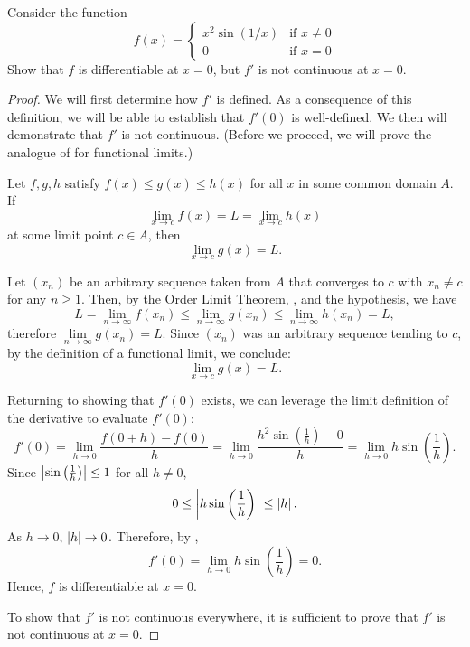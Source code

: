 \begin{problem}
  Consider the function
    \begin{equation*}
      f(x) = 
      \begin{cases}
        x^2 \sin(1/x) & \text{if } x \neq 0 \\
        0 & \text{if } x = 0
      \end{cases}
    \end{equation*}
  Show that $f$ is differentiable at $x = 0$, but $f'$ is not continuous at $x = 0$.

  \begin{proof}
    We will first determine how $f'$ is defined. As a consequence of this definition, we will be able to establish
    that $f'(0)$ is well-defined. We then will demonstrate that $f'$ is not continuous.
    (Before we proceed, we will prove the analogue of  for 
    functional limits.)

    \begin{theorem}
      \label{thm:squeeze-theorem-fn-limits}
      Let $f, g, h$ satisfy $f(x) \leq g(x) \leq h(x)$ for all $x$ in some common domain $A$. If
      \[
        \lim_{x \to c} f(x) = L = \lim_{x \to c} h(x)
      \]
      at some limit point $c \in A$, then
      \[
        \lim_{x \to c} g(x) = L.
      \]
    \end{theorem}

    \begin{subproof}
      Let $(x_{n})$ be an arbitrary sequence taken from $A$ that converges to
      $c$ with $x_{n} \neq c$ for any $n \geq 1$. Then, by the Order Limit
      Theorem, , and the hypothesis, we
      have
      \[
        L = \lim_{n \to \infty} f(x_{n}) \leq \lim_{n \to \infty} g(x_{n}) \leq \lim_{n \to \infty} h(x_{n}) = L,
      \]
      therefore $\lim\limits_{n \to \infty} g(x_{n}) = L$. Since $(x_{n})$ was
      an arbitrary sequence tending to $c$, by the definition of a functional limit,
      we conclude:
      \[
        \lim_{x \to c} g(x) = L.
      \]
    \end{subproof}

    Returning to showing that $f'(0)$ exists, we can leverage the limit
    definition of the derivative to evaluate $f'(0)$:
    \[
      f'(0) = \lim_{h \to 0} \frac{f(0+h) - f(0)}{h} = \lim_{h \to 0} \frac{h^2 \sin \left( \frac{1}{h} \right) - 0}{h} = \lim_{h \to 0} h \sin \left( \frac{1}{h} \right).
    \]
    Since $\left\lvert \sin \left( \frac{1}{h} \right) \right\rvert \leq 1$ for all $h \neq 0$,
    \[
      0 \leq \left\lvert h \sin \left( \frac{1}{h} \right) \right\rvert \leq \left\lvert h \right\rvert.
    \]
    As $h \to 0$, $\left\lvert h \right\rvert \to 0$. Therefore, by ,
    \[
      f'(0) = \lim_{h \to 0} h \sin\left(\frac{1}{h}\right) = 0.
    \]
    Hence, $f$ is differentiable at $x = 0$.

    To show that $f'$ is not continuous everywhere, it is sufficient to prove
    that $f'$  is not continuous at $x = 0$.

  \end{proof}
\end{problem}

